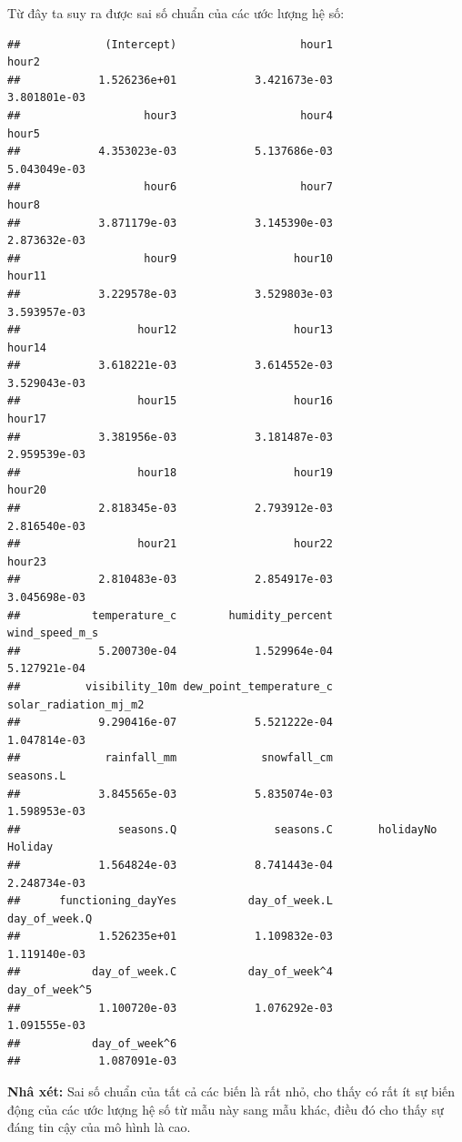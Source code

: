 \documentclass[
  11pt,
  letterpaper,
]{article}
\begin{document}
Từ đây ta suy ra được sai số chuẩn của các ước lượng hệ số:

\begin{verbatim}
##             (Intercept)                   hour1                   hour2 
##            1.526236e+01            3.421673e-03            3.801801e-03 
##                   hour3                   hour4                   hour5 
##            4.353023e-03            5.137686e-03            5.043049e-03 
##                   hour6                   hour7                   hour8 
##            3.871179e-03            3.145390e-03            2.873632e-03 
##                   hour9                  hour10                  hour11 
##            3.229578e-03            3.529803e-03            3.593957e-03 
##                  hour12                  hour13                  hour14 
##            3.618221e-03            3.614552e-03            3.529043e-03 
##                  hour15                  hour16                  hour17 
##            3.381956e-03            3.181487e-03            2.959539e-03 
##                  hour18                  hour19                  hour20 
##            2.818345e-03            2.793912e-03            2.816540e-03 
##                  hour21                  hour22                  hour23 
##            2.810483e-03            2.854917e-03            3.045698e-03 
##           temperature_c        humidity_percent          wind_speed_m_s 
##            5.200730e-04            1.529964e-04            5.127921e-04 
##          visibility_10m dew_point_temperature_c   solar_radiation_mj_m2 
##            9.290416e-07            5.521222e-04            1.047814e-03 
##             rainfall_mm             snowfall_cm               seasons.L 
##            3.845565e-03            5.835074e-03            1.598953e-03 
##               seasons.Q               seasons.C       holidayNo Holiday 
##            1.564824e-03            8.741443e-04            2.248734e-03 
##      functioning_dayYes           day_of_week.L           day_of_week.Q 
##            1.526235e+01            1.109832e-03            1.119140e-03 
##           day_of_week.C           day_of_week^4           day_of_week^5 
##            1.100720e-03            1.076292e-03            1.091555e-03 
##           day_of_week^6 
##            1.087091e-03
\end{verbatim}

\textbf{Nhâ xét:} Sai số chuẩn của tất cả các biến là rất nhỏ, cho thấy có rất ít sự biến động của các ước lượng hệ số từ mẫu này sang mẫu khác, điều đó cho thấy sự đáng tin cậy của mô hình là cao.
\end{document}
